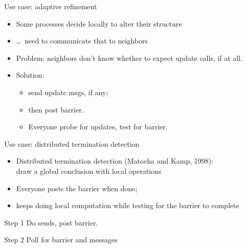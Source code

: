 \begin{numberedframe}{Use case: adaptive refinement}
  \begin{itemize}
  \item Some processes decide locally to alter their structure
  \item \ldots~need to communicate that to neighbors
  \item Problem: neighbors don't know whether to expect update calls,
    if at all.
  \item Solution:
    \begin{itemize}
    \item send update msgs, if any;
    \item then post barrier.
    \item Everyone probe for updates, test for barrier.    
    \end{itemize}
  \end{itemize}
\end{numberedframe}

\begin{numberedframe}{Use case: distributed termination detection}
  \begin{itemize}
  \item Distributed termination detection (Matocha and Kamp, 1998):\\
    draw a global conclusion with local operations
  \item Everyone posts the barrier when done;
  \item keeps doing local computation while testing for the barrier to
    complete
  \end{itemize}
\end{numberedframe}


\begin{numberedframe}{Step 1}
  Do sends, post barrier.
\end{numberedframe}

\begin{numberedframe}{Step 2}
  Poll for barrier and messages
\end{numberedframe}


\endinput

\begin{numberedframe}{}
\begin{lstlisting}
  
\end{lstlisting}
\end{numberedframe}

